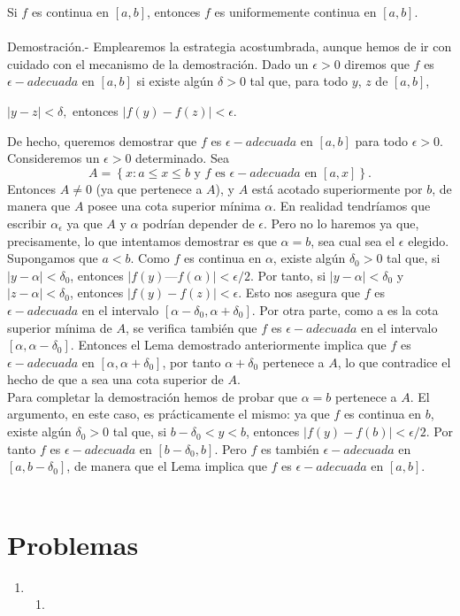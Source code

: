 \begin{teo}
    Si $f$ es continua en $[a,b]$, entonces $f$ es uniformemente continua en $[a,b]$.\\\\
	Demostración.-\; Emplearemos la estrategia acostumbrada, aunque hemos de ir con cuidado con el mecanismo de la demostración. Dado un $\epsilon>0$ diremos que $f$ es $\epsilon-adecuada$ en $[a,b]$ si existe algún $\delta>0$ tal que, para todo $y$,  $z$ de $[a,b]$,
	\begin{center}
	    $|y-z|<\delta,$ entonces $|f(y)-f(z)|<\epsilon.$
	\end{center}
	De hecho, queremos demostrar que $f$ es $\epsilon-adecuada$ en $[a,b]$ para todo $\epsilon>0.$\\
	Consideremos un $\epsilon>0$ determinado. Sea
	$$A=\left\{x:a\leq x \leq b \mbox{ y } f \mbox{ es } \epsilon-adecuada \mbox{ en } [a,x]\right\}.$$
	Entonces $A\neq 0$ (ya que pertenece a $A$), y $A$ está acotado superiormente por $b$, de manera que $A$ posee una cota superior mínima $\alpha$. En realidad tendríamos que escribir $\alpha_\epsilon$ ya que $A$ y $\alpha$ podrían depender de $\epsilon$. Pero no lo haremos ya que, precisamente, lo que intentamos demostrar es que $\alpha=b$, sea cual sea el $\epsilon$ elegido.\\
	Supongamos que $a < b$. Como $f$ es continua en $\alpha$, existe algún $\delta_0 > 0$ tal que, si $|y - \alpha| < \delta_0$, entonces $|f(y) — f(\alpha)| < \epsilon/2$. Por tanto, si $|y - \alpha| < \delta_0$ y $|z - \alpha| < \delta_0$, entonces $|f(y) - f(z)| < \epsilon$. Esto nos asegura que $f$ es $\epsilon-adecuada$ en el intervalo $[\alpha - \delta_0, \alpha + \delta_0]$. Por otra parte, como a es la cota superior mínima de $A$, se verifica también que $f$ es $\epsilon-adecuada$ en el intervalo $[\alpha, \alpha - \delta_0]$. Entonces el Lema demostrado anteriormente implica que $f$ es $\epsilon-adecuada$ en $[\alpha, \alpha + \delta_0]$, por tanto $\alpha + \delta_0$ pertenece a $A$, lo que contradice el hecho de que a sea una cota superior de $A$.\\
	Para completar la demostración hemos de probar que $\alpha = b$ pertenece a $A$. El argumento, en este caso, es prácticamente el mismo: ya que $f$ es continua en $b$, existe algún $\delta_0 > 0$ tal que, si $b - \delta_0 < y < b$, entonces $|f(y) - f(b)| < \epsilon/2$. Por tanto $f$ es $\epsilon-adecuada$ en $[b - \delta_0, b]$. Pero $f$ es también $\epsilon-adecuada$ en $[a, b - \delta_0]$, de manera que el Lema implica que $f$ es $\epsilon-adecuada$ en $[a,b]$.\\\\
\end{teo}

\section{Problemas}

\begin{enumerate}[\bfseries 1.]

    \item 
	\begin{enumerate}[\bfseries (a)]

	    \item 

	\end{enumerate}

\end{enumerate}
